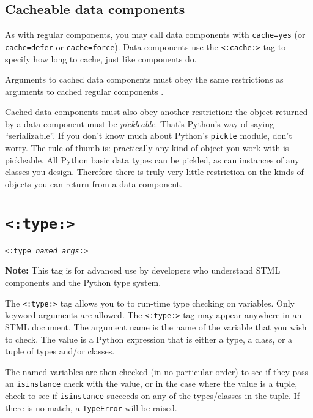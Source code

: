 \documentclass{manual}
\begin{document}
{{\subsection{Cacheable data components}
\label{tagdatacompcaching}

As with regular components, you may call data components with
\texttt{cache=yes} (or \texttt{cache=defer} or
\texttt{cache=force}). Data components use the \texttt{<:cache:>}
 tag to specify how long to cache, just like
components do.

Arguments to cached data components must obey the same 
restrictions as arguments 
to cached regular components .

Cached data components must also obey another restriction: 
the object returned by a data component must be \emph{pickleable}. 
That's Python's way of saying ``serializable''. If you don't 
know much about Python's \texttt{pickle} module, don't worry. 
The rule of thumb is: practically any kind of object you work 
with is pickleable. All Python basic data types can be pickled, 
as can instances of any classes you design. Therefore there is 
truly very little restriction on the kinds of objects you can 
return from a data component.




\section{\texttt{<:type:>}}
\label{tagtype}

\texttt{<:type \emph{named_args}:>}

\textbf{Note:} This tag is for advanced use by developers
who understand STML components and the Python type system.

The \texttt{<:type:>} tag allows you to to 
run-time type checking on variables.
Only keyword arguments are allowed.  The \texttt{<:type:>} 
tag may appear anywhere in an STML document. The argument name 
is the name of the variable that you wish to check.  
The value is a Python expression that is either a type, 
a class, or a tuple of types and/or classes.


The named variables are then checked (in no particular order) to see
if they pass an 
\texttt{isinstance} check with the value, or in the case where the
value is a tuple, check to see if \texttt{isinstance} succeeds on any
of the types/classes in the tuple.  If there is no match, a
\texttt{TypeError} will be raised.

}}
\end{document}
